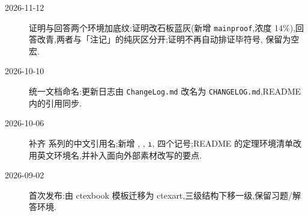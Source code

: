 
\begin{description}
    \item[2026-11-12] 证明与回答两个环境加底纹:证明改石板蓝灰(新增 \texttt{mainproof},浓度 14\%),回答改青,两者与「注记」的纯灰区分开;证明不再自动排证毕符号,\texttt{\string\qedhere} 保留为空宏.
    \item[2026-10-10] 统一文档命名:更新日志由 \texttt{ChangeLog.md} 改名为 \texttt{CHANGELOG.md},README 内的引用同步.
    \item[2026-10-06] 补齐 \texttt{\string\Cref} 系列的中文引用名;新增 \texttt{\string\Re}, \texttt{\string\Im}, \texttt{\string\i}, \texttt{\string\dd} 四个记号;README 的定理环境清单改用英文环境名,并补入面向外部素材改写的要点.
    \item[2026-09-02] 首次发布:由 ctexbook 模板迁移为 ctexart,三级结构下移一级,保留习题/解答环境.
\end{description}
